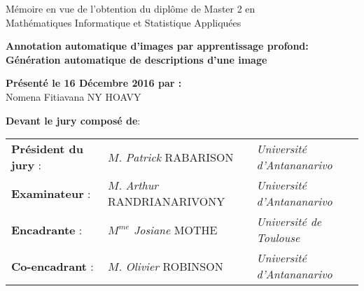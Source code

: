 \begin{titlepage}
\begin{center}
 \vspace{1.5cm}
 
 Mémoire en vue de l’obtention du diplôme de Master 2 en\\ 
 Mathématiques Informatique et Statistique Appliquées
 
 \vspace{1.5cm}
 \begin{Large}
 	\textbf{Annotation automatique d'images par apprentissage profond:\\ Génération automatique de descriptions d'une image}	\\
 \end{Large}
 \vspace{1.5cm}
\textbf{Présenté le 16 Décembre 2016 par :}\\
 Nomena Fitiavana NY HOAVY\\
 
 \vspace{3cm}
 
 \textbf{Devant le jury composé de}:
 
 \begin{tabular}{l l l}
 	\textbf{Président du jury} :&$M.$ \textsl{Patrick} RABARISON & \textsl{ \emph{Université d'Antananarivo}} \\
 	\textbf{Examinateur} :& $M.$  \textsl{Arthur} RANDRIANARIVONY &\textsl{ \emph{Université d'Antananarivo}}\\
 	\textbf{Encadrante} :& $M^{me}$ \textsl{Josiane} MOTHE& \textsl{ \emph{Université de Toulouse}}\\
 	\textbf{Co-encadrant} :   & $M.$ \textsl{Olivier} ROBINSON&\textsl{ \emph{Université d'Antananarivo}}\\
 \end{tabular}
\end{center}
\vspace{2cm}

\end{titlepage}
\restoregeometry  
